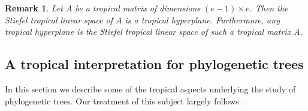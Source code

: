 \documentclass[12pt]{extarticle}
\numberwithin{theorem}{section}
\newtheorem{lemma}[theorem]{Lemma}
\newtheorem{definition}[theorem]{Definition}
\newtheorem{remark}[theorem]{Remark}
\newcommand{\RR}{\mathbb{R}}
\newcommand{\TP}{\mathbb{TP}}
\begin{document}
\begin{remark}
\label{tropical-hyperplane-valuated-matroid}
Let $A$ be a tropical matrix of dimensions $(e-1)\times e$. Then the Stiefel tropical linear space of $A$ is a tropical hyperplane. Furthermore, any tropical hyperplane is the Stiefel tropical linear space of such a tropical matrix $A$.
\end{remark}
\begin{comment}
\begin{definition}
Let $p:[e]^{e-1}\to\overline \RR$ be a Stiefel tropical linear space. Then we call the tropical linear space $\mathcal H$ corresponding to $p$ a \emph{tropical hyperplane}.
\end{definition}
\begin{lemma}
\label{tropical-hyperplane-valuated-matroid}
Let $v=(v_1,\ldots, v_e)\in\mathbb \overline \RR^e$ be any vector. Then there exists a tropical Pl\"ucker vector $p:[e]^{e-1}\to\overline \RR$ defined by
\[p([e]-\{i\})=v_i.\]
\end{lemma}
\begin{proof}
We check only the exchange relation. Let $\sigma$ be an $(e-2)$-sized subset of $[e]$, and let $\tau$ be $[e]$, the only $e$-sized subset of $[e]$. We need that the maximum
\[\max_{i\in [e]}(p(\sigma\cup\{i\}) + p([e]-\{i\}))\]
is attained at least twice. But if $i$ is a choice of index which attains a maximum, then $[e]-\sigma-\{i\}$ attains the same value. So the maximum is indeed attained at least twice.
\end{proof}

In tropical geometry, tropical hyperplanes are often introduced in a different form.

\begin{lemma}
\label{tropical-hyperplane}
Let $\mathcal H$ be a tropical hyperplane in $\TP^{e-1}$ and $p$ the tropical Pl\"ucker vector corresponding to $\mathcal H$. Write $v_i:=p([e]-\{i\})$. Then $\mathcal H$ is the tropical solution set of the tropical linear functional $\bigoplus (-v_i)\otimes x_i$.
\end{lemma}
\end{comment}

\subsection{A tropical interpretation for phylogenetic trees}
\label{tropical-interpretation-for-phylogenetics}

In this section we describe some of the tropical aspects underlying the study of phylogenetic trees. Our treatment of this subject largely follows \cite[Section 4.3]{MS}.
\end{document}
